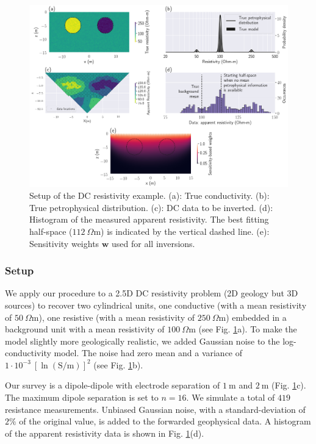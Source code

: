 \documentclass[extra]{gji} %
\begin{document}
\begin{figure}
\centering
\includegraphics[width=\textwidth]{Fig/LowRes/DC2p5D_Setup.png}
\caption[]{Setup of the DC resistivity example. (a): True conductivity. (b): True petrophysical distribution. (c): DC data to be inverted. (d): Histogram of the measured apparent resistivity. The best fitting half-space ($112~\Omega \text{m}$) is indicated by the vertical dashed line. (e): Sensitivity weights $\mathbf{w}$ used for all inversions.}
\label{fig:DC2p5D_Setup}
\end{figure}


\subsubsection{Setup}

We apply our procedure to a 2.5D DC resistivity problem (2D geology but 3D sources) to recover two cylindrical units, one conductive (with a mean resistivity of $50~\Omega \text{m}$), one resistive (with a mean resistivity of $250~\Omega \text{m}$) embedded in a background unit with a mean resistivity of $100~\Omega \text{m}$ (see Fig. \ref{fig:DC2p5D_Setup}a). To make the model slightly more geologically realistic, we added Gaussian noise to the log-conductivity model. The noise had zero mean and a variance of $1\cdot10^{-3}~[\ln(\text{S/m})]^2$ (see Fig. \ref{fig:DC2p5D_Setup}b).

Our survey is a dipole-dipole with electrode separation of $1~\text{m}$ and $2~\text{m}$ (Fig. \ref{fig:DC2p5D_Setup}c). The maximum dipole separation is set to $n=16$. We simulate a total of $419$ resistance measurements. Unbiased Gaussian noise, with a standard-deviation of $2\%$ of the original value, is added to the forwarded geophysical data. A histogram of the apparent resistivity data is shown in Fig. \ref{fig:DC2p5D_Setup}(d).
\end{document}
